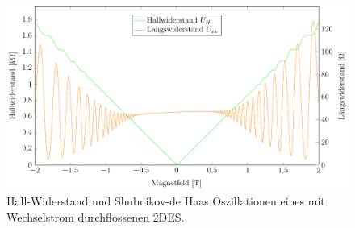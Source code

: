 \begin{figure}[h]
	\centering
	\includegraphics{graphs/ac/pm2T_range.pdf}
	\caption[Höher aufgelöste Wechselstrommessung in Magnetfeldteilbereich]{
		Hall-Widerstand und Shubnikov-de Haas Oszillationen eines mit Wechselstrom durchflossenen 2DES.
	}
	\label{fig:2T_range_ac}
\end{figure}